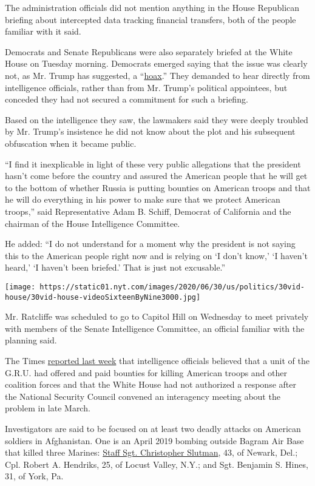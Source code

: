 The administration officials did not mention anything in the House
Republican briefing about intercepted data tracking financial transfers,
both of the people familiar with it said.

Democrats and Senate Republicans were also separately briefed at the
White House on Tuesday morning. Democrats emerged saying that the issue
was clearly not, as Mr. Trump has suggested, a
``\href{https://twitter.com/realdonaldtrump/status/1277431695248183298?lang=en}{hoax}.''
They demanded to hear directly from intelligence officials, rather than
from Mr. Trump's political appointees, but conceded they had not secured
a commitment for such a briefing.

Based on the intelligence they saw, the lawmakers said they were deeply
troubled by Mr. Trump's insistence he did not know about the plot and
his subsequent obfuscation when it became public.

``I find it inexplicable in light of these very public allegations that
the president hasn't come before the country and assured the American
people that he will get to the bottom of whether Russia is putting
bounties on American troops and that he will do everything in his power
to make sure that we protect American troops,'' said Representative Adam
B. Schiff, Democrat of California and the chairman of the House
Intelligence Committee.

He added: ``I do not understand for a moment why the president is not
saying this to the American people right now and is relying on `I don't
know,' `I haven't heard,' `I haven't been briefed.' That is just not
excusable.''

\texttt{[image: https://static01.nyt.com/images/2020/06/30/us/politics/30vid-house/30vid-house-videoSixteenByNine3000.jpg]}

Mr. Ratcliffe was scheduled to go to Capitol Hill on Wednesday to meet
privately with members of the Senate Intelligence Committee, an official
familiar with the planning said.

The Times
\href{https://www.nytimes.com/2020/06/26/us/politics/russia-afghanistan-bounties.html?action=click\&module=RelatedLinks\&pgtype=Article}{reported
last week} that intelligence officials believed that a unit of the
G.R.U. had offered and paid bounties for killing American troops and
other coalition forces and that the White House had not authorized a
response after the National Security Council convened an interagency
meeting about the problem in late March.

Investigators are said to be focused on at least two deadly attacks on
American soldiers in Afghanistan. One is an April 2019 bombing outside
Bagram Air Base that killed three Marines:
\href{https://www.nytimes.com/2019/04/09/nyregion/fdny-firefighter-killed-afghanistan.html}{Staff
Sgt. Christopher Slutman}, 43, of Newark, Del.; Cpl. Robert A. Hendriks,
25, of Locust Valley, N.Y.; and Sgt. Benjamin S. Hines, 31, of York, Pa.

